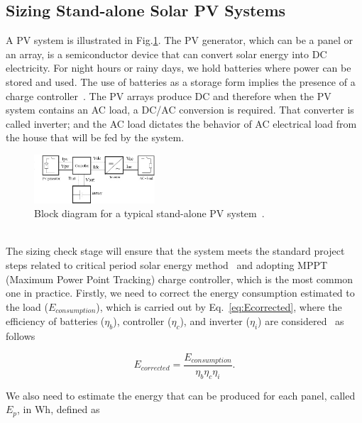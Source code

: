 \documentclass[runningheads]{llncs}
\begin{document}
\subsection{Sizing Stand-alone Solar PV Systems}
\label{sec:sizing}
A PV system is illustrated in Fig.\ref{fig:blockdiagram}. %
The PV generator, which can be a panel or an array, is a semiconductor device that can convert solar energy into DC electricity. %
For night hours or rainy days, we hold batteries where power can be stored and used. The use of batteries as a storage form implies the presence of a charge controller~\cite{Hansen}. The PV arrays produce DC and therefore when the PV system contains an AC load, a DC/AC conversion is required. That converter is called inverter; and the AC load dictates the behavior of AC electrical load from the house that will be fed by the system.
\begin{figure}[h]
\includegraphics[width=0.4\textwidth]{blockdiagramPVS2_rev}
\centering
\caption{Block diagram for a typical stand-alone PV system~\cite{Hansen}.}
\label{fig:blockdiagram} 
\end{figure}
\\
%
The sizing check stage will ensure that the system meets the standard project steps related to critical period solar energy method~\cite{Pinho} and adopting MPPT (Maximum Power Point Tracking) charge controller, which is the most common one in practice. 
%
Firstly, we need to correct the energy consumption estimated to the load ($E_{consumption}$), which is carried out by Eq.~\ref{eq:Ecorrected}, where the efficiency of batteries ($\eta_{b}$), controller ($\eta_{c}$), and inverter ($\eta_{i}$) are considered~\cite{Pinho} as follows

\begin{equation}
\label{eq:Ecorrected}
E_{corrected} = \frac {E_{consumption}}{\eta_{b} \eta_{c} \eta_{i} }.
\end{equation}

We also need to estimate the energy that can be produced for each panel, called $E_{p}$, in Wh, defined as
\end{document}
